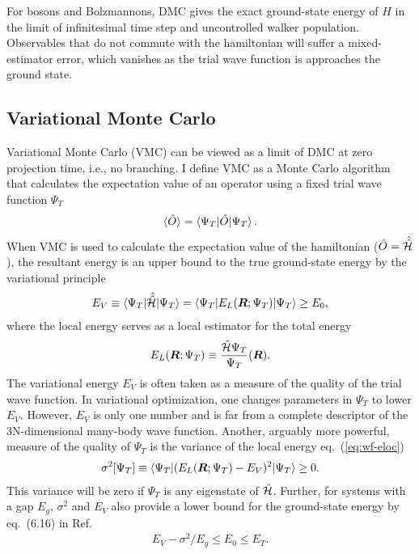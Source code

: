 For bosons and Bolzmannons, DMC gives the exact ground-state energy of $H$ in the limit of infinitesimal time step and uncontrolled walker population. Observables that do not commute with the hamiltonian will suffer a mixed-estimator error, which vanishes as the trial wave function is approaches the ground state.

\subsection{Variational Monte Carlo}
Variational Monte Carlo (VMC) can be viewed as a limit of DMC at zero projection time, i.e., no branching. I define VMC as a Monte Carlo algorithm that calculates the expectation value of an operator using a fixed trial wave function $\Psi_T$
\begin{align} \label{eq:vmc}
\braket{\hat{O}} = \braket{\Psi_T|\hat{O}|\Psi_T}.
\end{align}
When VMC is used to calculate the expectation value of the hamiltonian ($\hat{O}=\hat{\hat{\mathcal{H}}}$), the resultant energy is an upper bound to the true ground-state energy by the variational principle
\begin{align} \label{eq:wf-variational}
E_V\equiv \braket{\Psi_T|\hat{\hat{\mathcal{H}}}|\Psi_T} = \braket{\Psi_T|E_L(\boldsymbol{R};\Psi_T)|\Psi_T} \ge E_0,
\end{align}
where the local energy serves as a local estimator for the total energy
\begin{align} \label{eq:wf-eloc}
E_L(\boldsymbol{R};\Psi_T) \equiv \dfrac{\hat{\mathcal{H}}\Psi_T}{\Psi_T} (\boldsymbol{R}).
\end{align}
The variational energy $E_V$ is often taken as a measure of the quality of the trial wave function.
In variational optimization, one changes parameters in $\Psi_T$ to lower $E_V$.
However, $E_V$ is only one number and is far from a complete descriptor of the 3N-dimensional many-body wave function.
Another, arguably more powerful, measure of the quality of $\Psi_T$ is the variance of the local energy eq.~(\ref{eq:wf-eloc})
\begin{align}
\sigma^2[\Psi_T] \equiv \braket{\Psi_T|(E_L(\boldsymbol{R};\Psi_T)-E_V)^2|\Psi_T}\ge 0.
\end{align}
This variance will be zero if $\Psi_T$ is any eigenstate of $\hat{\mathcal{H}}$. Further, for systems with a gap $E_g$, $\sigma^2$ and $E_V$ also provide a lower bound for the ground-state energy by eq.~(6.16) in Ref.~\cite{Martin2016}
\begin{align}
E_V-\sigma^2/E_g \le E_0 \le E_T.
\end{align}

